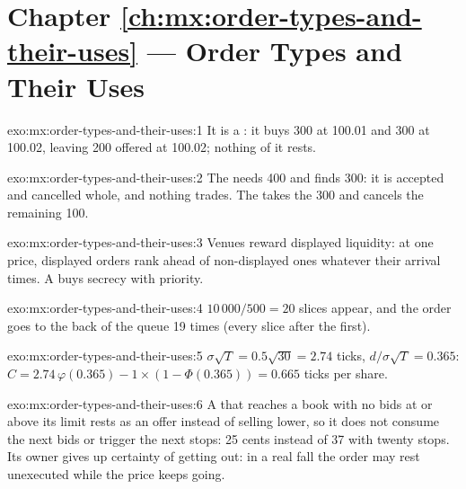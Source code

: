 \section*{Chapter \ref{ch:mx:order-types-and-their-uses} --- Order Types and Their Uses}

\begin{solution}{exo:mx:order-types-and-their-uses:1}
It is a : it buys 300 at 100.01 and 300 at 100.02, leaving 200 offered at 100.02; nothing of it rests.
\end{solution}

\begin{solution}{exo:mx:order-types-and-their-uses:2}
The  needs 400 and finds 300: it is accepted and cancelled whole, and nothing trades. The  takes the 300
and cancels the remaining 100.
\end{solution}

\begin{solution}{exo:mx:order-types-and-their-uses:3}
Venues reward displayed liquidity: at one price, displayed orders rank ahead of non-displayed ones whatever their arrival times. A  buys
secrecy with priority.
\end{solution}

\begin{solution}{exo:mx:order-types-and-their-uses:4}
$10\,000/500=20$ slices appear, and the order goes to the back of the queue 19 times (every slice after the first).
\end{solution}

\begin{solution}{exo:mx:order-types-and-their-uses:5}
$\sigma\sqrt T=0.5\sqrt{30}=2.74$ ticks, $d/\sigma\sqrt T=0.365$: $C=2.74\,\varphi(0.365)-1\times(1-\Phi(0.365))=0.665$ ticks per share.
\end{solution}

\begin{solution}{exo:mx:order-types-and-their-uses:6}
A  that reaches a book with no bids at or above its limit rests as an offer instead of selling lower, so it does not consume the next
bids or trigger the next stops: 25 cents instead of 37 with twenty stops. Its owner gives up certainty of getting out: in a real fall the order may
rest unexecuted while the price keeps going.
\end{solution}

